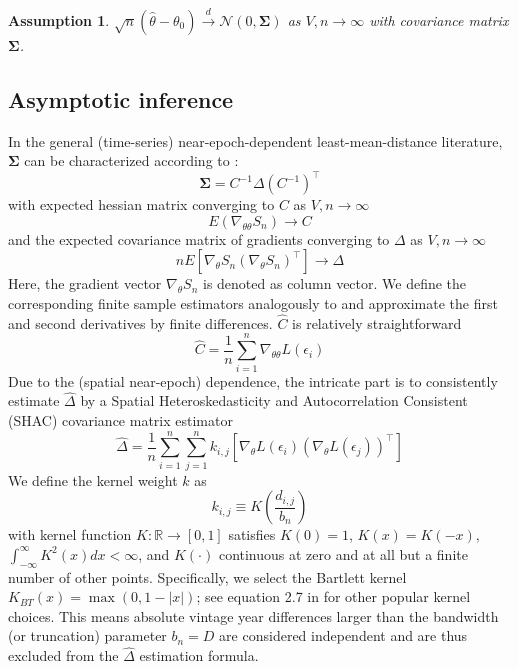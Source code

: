 \documentclass[12pt]{article}
\newtheorem{assume}{Assumption}
\begin{document}
\begin{assume}
	$\sqrt{n}(\hat{\theta} - \theta_0) \overset{d}{\to} \mathcal{N}(0,\mathbf{\Sigma})$ as $V,n \to \infty$ with covariance matrix $\mathbf{\Sigma}$.
\end{assume}

\subsection{Asymptotic inference}
\label{sec:asymptotic_inference}

In the general (time-series) near-epoch-dependent least-mean-distance literature, $\mathbf{\Sigma}$ can be characterized according to \citet[Theorem 11.2.b, Theorem H.1]{PP97}:
\[
\mathbf{\Sigma} = C^{-1} \Delta (C^{-1})^\top
\]
with expected hessian matrix converging to $C$ as $V,n \to \infty$
\[
E 
\left(
\nabla_{\theta \theta} S_n
\right)
\to C
\]
and the expected covariance matrix of gradients converging to $\Delta$ as $V,n \to \infty$
\[
n E 
\left[
\nabla_{\theta} S_n
(\nabla_{\theta} S_n)^\top
\right]
\to \Delta
\]
Here, the gradient vector $\nabla_{\theta} S_n$ is denoted as column vector.
We define the corresponding finite sample estimators analogously to \citet[Chapters 12, 13.1]{PP97} and approximate the first and second derivatives by finite differences. $\hat{C}$ is relatively straightforward
\[
\hat{C} = \frac{1}{n} \sum_{i=1}^n \nabla_{\theta \theta} L \left( \epsilon_i \right)
\]
Due to the (spatial near-epoch) dependence, the intricate part is to consistently estimate $\hat{\Delta}$ by a Spatial Heteroskedasticity and Autocorrelation Consistent (SHAC) covariance matrix estimator \cite[equation 2]{KS11}
\[
\hat{\Delta} = \frac{1}{n} \sum_{i=1}^n \sum_{j=1}^n
k_{i,j}
\left[
\nabla_{\theta} L \left( \epsilon_i \right)
\left(
\nabla_{\theta} L \left( \epsilon_j \right)
\right)^\top
\right]
\]
We define the kernel weight $k$ as
\[
k_{i,j} \equiv K \left( \frac{d_{i,j}}{b_n} \right)
\]
with kernel function $K: \mathbb{R} \to [0,1]$ satisfies $K(0)=1$, $K(x)=K(-x)$, $\int_{-\infty}^{\infty} K^2(x) dx < \infty$, and $K(\cdot)$ continuous at zero and at all but a finite number of other points.
Specifically, we select the Bartlett kernel $K_{BT}(x)= \max(0, 1-|x|)$; see equation 2.7 in \cite{A91} for other popular kernel choices.
This means absolute vintage year differences larger than the bandwidth (or truncation) parameter $b_n=D$ are considered independent and are thus excluded from the $\hat{\Delta}$ estimation formula.
\end{document}

